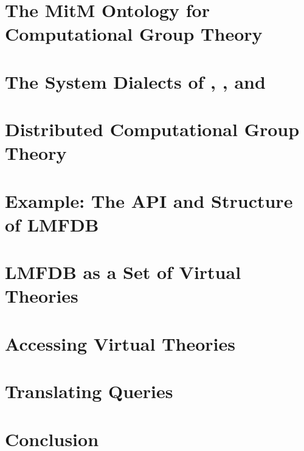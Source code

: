 \documentclass[book]{deliverablereport}
\providecommand{\lmfdb}{\textsf{LMFDB}\xspace}
\begin{document}
\section[Group Theory in MitM]{The MitM Ontology for Computational Group Theory}\label{sec:cgt}


\section[System Dialects]{The System Dialects of \GAP, \Sage, and \Singular}\label{sec:apit}


\section[Distributed Computation]{Distributed Computational Group Theory}\label{sec:case}


\section[LMFDB API]{Example: The API and Structure of LMFDB}\label{sec:sota}


\section[LMFDB as Virt. Theories]{\lmfdb as a Set of Virtual Theories}\label{sec:vt}


\section{Accessing Virtual Theories}\label{sec:access}


\section{Translating Queries}\label{sec:qmt}


\section{Conclusion}\label{sec:concl}

\end{document}
